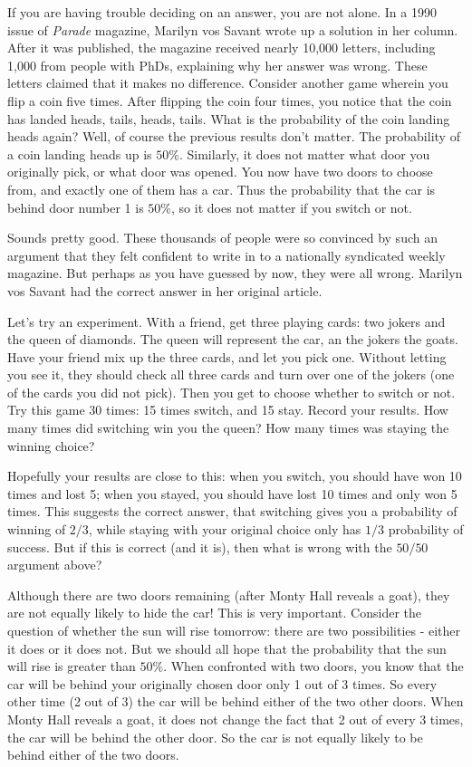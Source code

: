 If you are having trouble deciding on an answer, you are not alone.  In a 1990 issue of {\em Parade} magazine, Marilyn vos Savant wrote up a solution in her column.  After it was published, the magazine received nearly 10,000 letters, including 1,000 from people with PhDs, explaining why her answer was wrong.  These letters claimed that it makes no difference.  Consider another game wherein you flip a coin five times.  After flipping the coin four times, you notice that the coin has landed heads, tails, heads, tails.  What is the probability of the coin landing heads again?  Well, of course the previous results don't matter.  The probability of a coin landing heads up is $50\%$.  Similarly, it does not matter what door you originally pick, or what door was opened.  You now have two doors to choose from, and exactly one of them has a car. Thus the probability that the car is behind door number 1 is $50\%$, so it does not matter if you switch or not.

Sounds pretty good.  These thousands of people were so convinced by such an argument that they felt confident to write in to a nationally syndicated weekly magazine.  But perhaps as you have guessed by now, they were all wrong.  Marilyn vos Savant had the correct answer in her original article.  

Let's try an experiment.  With a friend, get three playing cards: two jokers and the queen of diamonds.  The queen will represent the car, an the jokers the goats.  Have your friend mix up the three cards, and let you pick one.  Without letting you see it, they should check all three cards and turn over one of the jokers (one of the cards you did not pick).  Then you get to choose whether to switch or not.  Try this game 30 times: 15 times switch, and 15 stay.  Record your results.  How many times did switching win you the queen?  How many times was staying the winning choice?

Hopefully your results are close to this: when you switch, you should have won 10 times and lost 5; when you stayed, you should have lost 10 times and only won 5 times.  This suggests the correct answer, that switching gives you a probability of winning of $2/3$, while staying with your original choice only has $1/3$ probability of success.  But if this is correct (and it is), then what is wrong with the $50/50$ argument above?  

Although there are two doors remaining (after Monty Hall reveals a goat), they are not equally likely to hide the car!  This is very important.  Consider the question of whether the sun will rise tomorrow: there are two possibilities - either it does or it does not.  But we should all hope that the probability that the sun will rise is greater than $50\%$.  When confronted with two doors, you know that the car will be behind your originally chosen door only 1 out of 3 times.  So every other time (2 out of 3) the car will be behind either of the two other doors.  When Monty Hall reveals a goat, it does not change the fact that 2 out of every 3 times, the car will be behind the other door.  So the car is not equally likely to be behind either of the two doors.  

